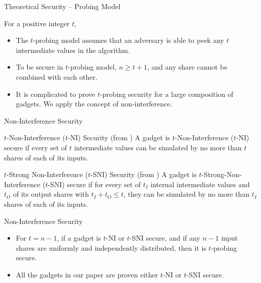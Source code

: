 \begin{frame}{Theoretical Security – Probing Model}

For a positive integer $t$,
\begin{itemize}
	\item The $t$-probing model  \cite{C:IshSahWag03} assumes that an adversary is able to peek any $t$ intermediate values in the algorithm.
	\pause
	\item To be secure in $t$-probing model, $n \geq t+1$, and any share cannot be combined with each other.
	\pause
	\item It is complicated to prove $t$-probing security for a large composition of gadgets. We apply the concept of non-interference.
\end{itemize}

\end{frame}


\begin{frame}{Non-Interference Security}

\begin{definition}{$t$-Non-Interference ($t$-NI) Security (from \cite{CCS:BBDFGS16})}
A gadget is $t$-Non-Interference ($t$-NI) secure if every set of $t$ intermediate values can be simulated by no more than $t$ shares of each of its inputs.
\end{definition}
\medskip
\pause

\begin{definition}{$t$-Strong Non-Interference ($t$-SNI) Security (from \cite{CCS:BBDFGS16})}
A gadget is $t$-Strong-Non-Interference ($t$-SNI) secure if for every set of $t_I$ internal intermediate values and $t_O$ of its output shares with $t_I + t_O \leq t$, they can be simulated by no more than $t_I$ shares of each of its inputs.
\end{definition}
\medskip

\end{frame}


\begin{frame}{Non-Interference Security}

\begin{itemize}

\item For $t = n-1$, if a gadget is $t$-NI or $t$-SNI secure, and if any $n-1$ input shares are uniformly and independently distributed, then it is $t$-probing secure.
\pause

\item All the gadgets in our paper are proven either $t$-NI or $t$-SNI secure.

\end{itemize}


\end{frame}


